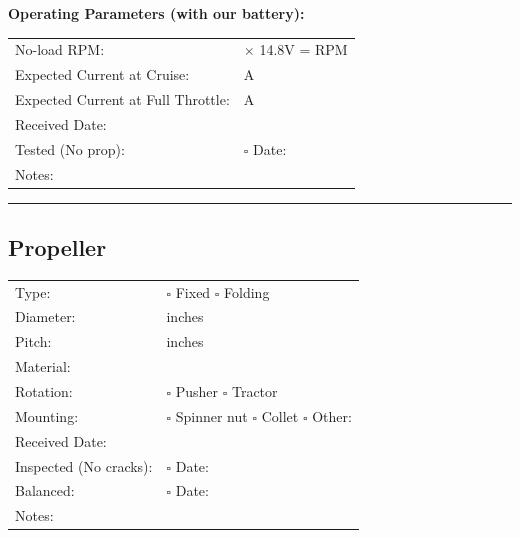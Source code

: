 \documentclass[10pt,letterpaper]{article}
\begin{document}
\textbf{Operating Parameters (with our battery):}
\begin{tabularx}{\textwidth}{lX}
No-load RPM: & \underline{\hspace{3cm}} $\times$ 14.8V = \underline{\hspace{4cm}} RPM \\
Expected Current at Cruise: & \underline{\hspace{4cm}} A \\
Expected Current at Full Throttle: & \underline{\hspace{4cm}} A \\[0.5em]
Received Date: & \underline{\hspace{4cm}} \\
Tested (No prop): & $\square$ \quad Date: \underline{\hspace{3cm}} \\
Notes: & \underline{\hspace{10cm}} \\
\end{tabularx}

\vspace{0.5em}
\hrule
\vspace{0.5em}

\subsection*{Propeller}
\begin{tabularx}{\textwidth}{lX}
Type: & $\square$ Fixed \quad $\square$ Folding \\
Diameter: & \underline{\hspace{4cm}} inches \\
Pitch: & \underline{\hspace{4cm}} inches \\
Material: & \underline{\hspace{6cm}} \\
Rotation: & $\square$ Pusher \quad $\square$ Tractor \\
Mounting: & $\square$ Spinner nut $\square$ Collet $\square$ Other: \underline{\hspace{3cm}} \\[0.5em]
Received Date: & \underline{\hspace{4cm}} \\
Inspected (No cracks): & $\square$ \quad Date: \underline{\hspace{3cm}} \\
Balanced: & $\square$ \quad Date: \underline{\hspace{3cm}} \\
Notes: & \underline{\hspace{10cm}} \\
\end{tabularx}
\end{document}
